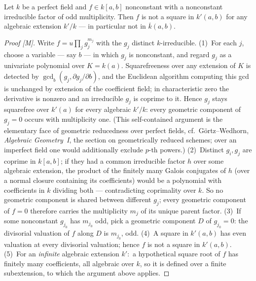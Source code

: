 \begin{lemma}\label{lem:sqfree_basechange}
Let $k$ be a perfect field and $f\in k[a,b]$ nonconstant with a nonconstant
irreducible factor of odd multiplicity.  Then $f$ is not a square in $k'(a,b)$
for any algebraic extension $k'/k$ --- in particular not in $\overline{k}(a,b)$.
\end{lemma}
\begin{proof}[Proof {[M]}]
Write $f=u\prod_{j}g_{j}^{m_{j}}$ with the $g_{j}$ distinct $k$-irreducible.
(1)~For each $j$, choose a variable --- say $b$ --- in which $g_{j}$ is
nonconstant, and regard $g_{j}$ as a univariate polynomial over $K=k(a)$.
Squarefreeness over any extension of $K$ is detected by
$\gcd_{b}(g_{j},\partial g_{j}/\partial b)$, and the Euclidean algorithm
computing this gcd is unchanged by extension of the coefficient field; in
characteristic zero the derivative is nonzero and an irreducible $g_{j}$ is
coprime to it.  Hence $g_{j}$ stays squarefree over $k'(a)$ for every
algebraic $k'/k$: every geometric component of $g_{j}=0$ occurs with
multiplicity one.  (This self-contained argument is the elementary face of
geometric reducedness over perfect fields, cf.\ G\"ortz--Wedhorn,
\emph{Algebraic Geometry~I}, the section on geometrically reduced schemes;
over an imperfect field one would additionally exclude $p$-th powers.)  (2)~Distinct $g_{i},g_{j}$ are coprime in $k[a,b]$; if they had a common
irreducible factor $h$ over some algebraic extension, the product of the
finitely many Galois conjugates of $h$ (over a normal closure containing its
coefficients) would be a polynomial with coefficients in $k$ dividing both ---
contradicting coprimality over $k$.  So no geometric component is shared
between different $g_{j}$; every geometric component of $f=0$ therefore carries the
multiplicity $m_{j}$ of its unique parent factor.  (3)~If some nonconstant
$g_{j_0}$ has $m_{j_0}$ odd, pick a geometric component $D$ of $g_{j_0}=0$: the
divisorial valuation of $f$ along $D$ is $m_{j_0}$, odd.  (4)~A square in
$k'(a,b)$ has even valuation at every divisorial valuation; hence $f$ is not a
square in $k'(a,b)$.  (5)~For an \emph{infinite} algebraic extension $k'$:\ a
hypothetical square root of $f$ has finitely many coefficients, all algebraic
over $k$, so it is defined over a finite subextension, to which the argument
above applies.
\end{proof}

